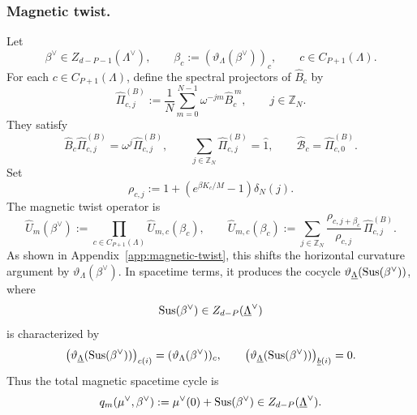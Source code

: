 \subsubsection{Magnetic twist.}
Let
\begin{equation}
\beta^\vee\in Z_{d-P-1}(\Lambda^\vee),
\qquad
\beta_c:=(\vartheta_\Lambda(\beta^\vee))_c,
\qquad
c\in C_{P+1}(\Lambda).
\end{equation}
For each \(c\in C_{P+1}(\Lambda)\), define the spectral projectors of \(\hat B_c\) by
\begin{equation}
	\hat\Pi_{c,j}^{(B)}
	:=
	\frac1N\sum_{m=0}^{N-1}\omega^{-jm}\hat B_c^{\,m},
	\qquad
	j\in\mathbb Z_N.
\end{equation}
They satisfy
\begin{equation}
\hat B_c\hat\Pi_{c,j}^{(B)}
=
\omega^j\hat\Pi_{c,j}^{(B)},
\qquad
\sum_{j\in\mathbb Z_N}\hat\Pi_{c,j}^{(B)}=\hat 1,
\qquad
\hat{\mathcal B}_c=\hat\Pi_{c,0}^{(B)}.
\end{equation}
Set
\begin{equation}
	\rho_{c,j}
	:=
	1+\left(e^{\beta K_c/M}-1\right)\delta_N(j).
\end{equation}
The magnetic twist operator is
\begin{equation}
	\hat U_m(\beta^\vee)
	:=
	\prod_{c\in C_{P+1}(\Lambda)}\hat U_{m,c}(\beta_c),
	\qquad
	\hat U_{m,c}(\beta_c)
	:=
	\sum_{j\in\mathbb Z_N}
	\frac{\rho_{c,j+\beta_c}}{\rho_{c,j}}\,
	\hat\Pi_{c,j}^{(B)} .
	\label{eq:magnetic-twist-operator}
\end{equation}
As shown in Appendix~\ref{app:magnetic-twist}, this shifts the horizontal curvature
argument by \(\vartheta_\Lambda(\beta^\vee)\). In spacetime terms, it produces the cocycle
\(\vartheta_{\underline\Lambda}(\operatorname{Sus}(\beta^\vee))\), where
\begin{equation}
	\operatorname{Sus}(\beta^\vee)
	\in Z_{d-P}(\underline\Lambda^\vee)
	\label{eq:magnetic-suspension}
\end{equation}
is characterized by
\begin{equation}
	\left(\vartheta_{\underline\Lambda}(\operatorname{Sus}(\beta^\vee))\right)_{c(i)}
	=
	(\vartheta_\Lambda(\beta^\vee))_c,
	\qquad
	\left(\vartheta_{\underline\Lambda}(\operatorname{Sus}(\beta^\vee))\right)_{\underline b(i)}
	=
	0.
	\label{eq:eta-hor-beta-components}
\end{equation}
Thus the total magnetic spacetime cycle is
\begin{equation}
	q_m(\mu^\vee,\beta^\vee)
	:=
	\mu^\vee(0)+\operatorname{Sus}(\beta^\vee)
	\in Z_{d-P}(\underline\Lambda^\vee).
	\label{eq:qm}
\end{equation}

